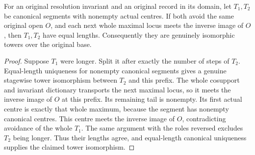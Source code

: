 \begin{theorem}
\label{hir:original-first-meeting-nonempty-length}
\leanok
{}
For an original resolution invariant and an original record in its
domain, let $T_1,T_2$ be canonical segments with nonempty actual centres.
If both avoid the same original open $O$, and each next whole maximal
locus meets the inverse image of $O$, then $T_1,T_2$ have equal lengths.
Consequently they are genuinely isomorphic towers over the original base.
\end{theorem}
\begin{proof}
Suppose $T_1$ were longer.  Split it after exactly the number of steps of
$T_2$.  Equal-length uniqueness for nonempty canonical segments gives a
genuine stagewise tower isomorphism between $T_2$ and this prefix.  The
whole cosupport and invariant dictionary transports the next maximal
locus, so it meets the inverse image of $O$ at this prefix.  Its remaining
tail is nonempty.  Its first actual centre is exactly that whole maximum,
because the segment has nonempty canonical centres.  This centre meets
the inverse image of $O$, contradicting avoidance of the whole $T_1$.
The same argument with the roles reversed excludes $T_2$ being longer.
Thus their lengths agree, and equal-length canonical uniqueness supplies
the claimed tower isomorphism.
\end{proof}

